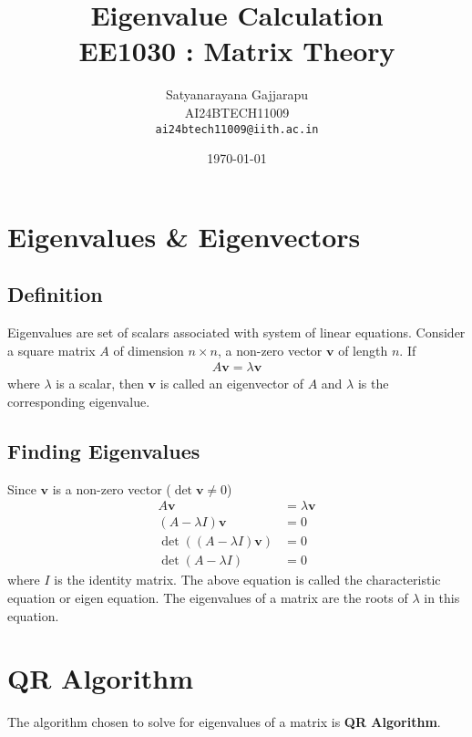 \documentclass[12pt,a4paper]{article}
\title{\textbf{Eigenvalue Calculation} \\
\large EE1030 : Matrix Theory}
\author{Satyanarayana Gajjarapu \\
AI24BTECH11009 \\
\texttt{ai24btech11009@iith.ac.in} \\
}
\date{\today}
\begin{document}
\maketitle
\section{Eigenvalues \& Eigenvectors}
\subsection{Definition}
Eigenvalues are set of scalars associated with system of linear equations. Consider a square matrix $A$ of dimension $n \times n$, a non-zero vector $\mathbf{v}$ of length $n$. If
\begin{align*}
    A\mathbf{v} = \lambda\mathbf{v}
\end{align*}
where $\lambda$ is a scalar, then $\mathbf{v}$ is called an eigenvector of $A$ and $\lambda$ is the corresponding eigenvalue.
\subsection{Finding Eigenvalues}
Since $\mathbf{v}$ is a non-zero vector ($\det{\mathbf{v}} \neq 0$)
\begin{align*}
    A\mathbf{v} & = \lambda\mathbf{v} \\
    (A - \lambda I)\mathbf{v} & = 0 \\
    \det((A - \lambda I)\mathbf{v}) & = 0 \\
    \det(A - \lambda I) & = 0
\end{align*}
where $I$ is the identity matrix. The above equation is called the characteristic equation or eigen equation. The eigenvalues of a matrix are the roots of $\lambda$ in this equation.
\section{QR Algorithm}
The algorithm chosen to solve for eigenvalues of a matrix is \textbf{QR Algorithm}.
\end{document}
